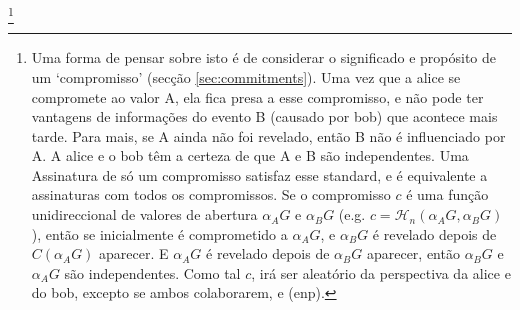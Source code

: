 \footnote{Uma forma de pensar sobre isto é de considerar o significado e propósito de um `compromisso' (secção \ref{sec:commitments}). Uma vez que a alice se compromete ao valor A, ela fica presa a esse compromisso, e não pode ter vantagens de informações do evento B (causado por bob) que acontece mais tarde. Para mais, se A ainda não foi revelado, então B não é influenciado por A. A alice e o bob têm a certeza de que A e B são independentes. Uma Assinatura de só um compromisso satisfaz esse standard, e é equivalente a assinaturas com todos os compromissos. Se o compromisso $c$ é uma função unidireccional de valores de abertura $\alpha_A G$ e $\alpha_B G$ (e.g. $c = \mathcal{H}_n(\alpha_A G,\alpha_B G)$), então se inicialmente é comprometido a $\alpha_A G$, e $\alpha_B G$ é revelado depois de $C(\alpha_A G)$ aparecer. E $\alpha_A G$ é revelado depois de $\alpha_B G$ aparecer, então $\alpha_B G$ e $\alpha_A G$ são independentes. Como tal $c$, irá ser aleatório da perspectiva da alice e do bob, excepto se ambos colaborarem, e (enp).} 

